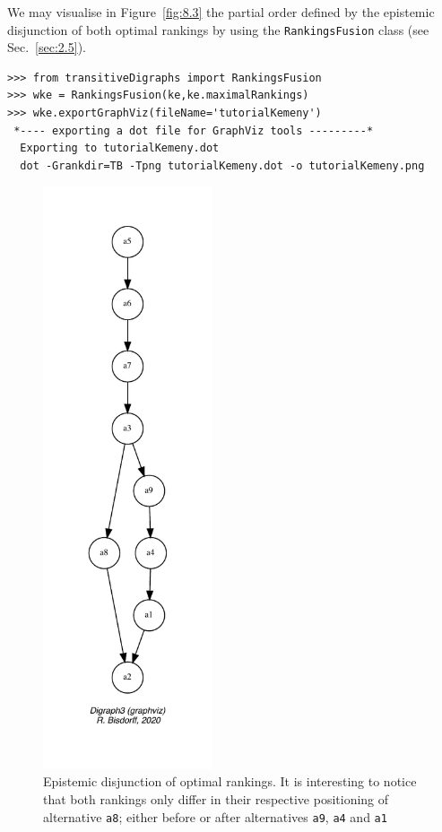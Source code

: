 We may visualise in Figure~\vref{fig:8.3} the partial order defined by the epistemic disjunction of both optimal \Kemeny rankings by using the \texttt{RankingsFu\-sion} class (see Sec.~\ref{sec:2.5}).
\begin{lstlisting}[caption={Computing the epistemic disjunction of all optimal \Kemeny rankings},label=list:8.9]   
>>> from transitiveDigraphs import RankingsFusion
>>> wke = RankingsFusion(ke,ke.maximalRankings)
>>> wke.exportGraphViz(fileName='tutorialKemeny')
 *---- exporting a dot file for GraphViz tools ---------*
  Exporting to tutorialKemeny.dot
  dot -Grankdir=TB -Tpng tutorialKemeny.dot -o tutorialKemeny.png
\end{lstlisting}
\begin{figure}[ht]
\sidecaption[t]
\includegraphics[width=5cm]{Figures/8-3-tutorialKemeny.pdf}
\caption{Epistemic disjunction of optimal \Kemeny rankings. It is interesting to notice that both \Kemeny rankings only differ in their respective positioning of alternative \texttt{a8}; either before or after alternatives \texttt{a9}, \texttt{a4} and \texttt{a1}}
\label{fig:8.3}       %
\end{figure}

